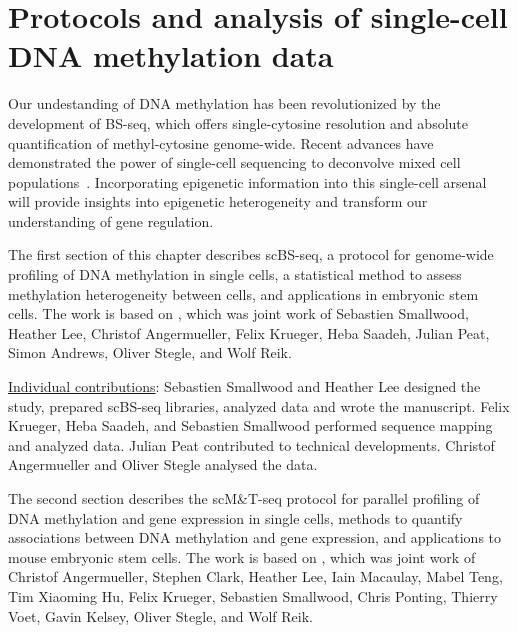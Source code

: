 \chapter{Protocols and analysis of single-cell DNA methylation data}

\ifpdf
    \graphicspath{{Chapter3/Figs/Raster/}{Chapter3/Figs/PDF/}{Chapter3/Figs/}}
\else
    \graphicspath{{Chapter3/Figs/Vector/}{Chapter3/Figs/}}
\fi

Our undestanding of DNA methylation has been revolutionized by the development of BS-seq, which offers single-cytosine resolution and absolute quantification of methyl-cytosine genome-wide. Recent advances have demonstrated the power of single-cell sequencing to deconvolve mixed cell populations~\citep{jain_supervised_2007,deng_single-cell_2014,macaulay_single_2014}. Incorporating epigenetic information into this single-cell arsenal will provide insights into epigenetic heterogeneity and transform our understanding of gene regulation.

The first section of this chapter describes scBS-seq, a protocol for genome-wide profiling of DNA methylation in single cells, a statistical method to assess methylation heterogeneity between cells, and applications in embryonic stem cells. The work is based on \citet{smallwood_single-cell_2014}, which was joint work of Sebastien Smallwood, Heather Lee, Christof Angermueller, Felix Krueger, Heba Saadeh, Julian Peat, Simon Andrews, Oliver Stegle, and Wolf Reik.

\begin{center}
\begin{minipage}{.9\linewidth}
\underline{Individual contributions}: Sebastien Smallwood and Heather Lee designed the study, prepared scBS-seq libraries, analyzed data and wrote the manuscript. Felix Krueger, Heba Saadeh, and Sebastien Smallwood performed sequence mapping and analyzed data. Julian Peat contributed to technical developments. Christof Angermueller and Oliver Stegle analysed the data.
\end{minipage}
\end{center}

The second section describes the scM\&T-seq protocol for parallel profiling of DNA methylation and gene expression in single cells, methods to quantify associations between DNA methylation and gene expression, and applications to mouse embryonic stem cells. The work is based on \citet{angermueller_parallel_2016}, which was joint work of Christof Angermueller, Stephen Clark, Heather Lee, Iain Macaulay, Mabel Teng, Tim Xiaoming Hu, Felix Krueger, Sebastien Smallwood, Chris Ponting, Thierry Voet, Gavin Kelsey, Oliver Stegle, and Wolf Reik.

